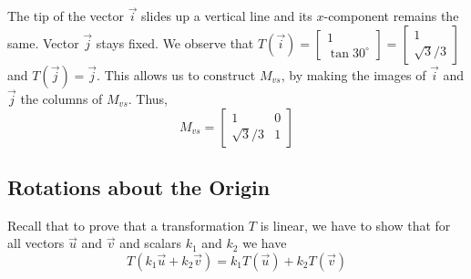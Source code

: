 \documentclass{ximera}
\begin{document}
\begin{example}
\begin{explanation}
\begin{center}
   \quad\quad
{}
\end{center}

The tip of the vector $\vec{i}$ slides up a vertical line and its $x$-component remains the same.  Vector $\vec{j}$ stays fixed.  We observe that $T(\vec{i})=\begin{bmatrix}
1 \\
\tan 30^{\circ}
\end{bmatrix}=\begin{bmatrix}
1 \\
\sqrt{3}/3
\end{bmatrix}$ and $T(\vec{j})=\vec{j}$.  This allows us to construct $M_{vs}$, by making the images of $\vec{i}$ and $\vec{j}$ the columns of $M_{vs}$.  Thus, 
$$M_{vs}=\begin{bmatrix}
1 & 0\\
\sqrt{3}/3 & 1
\end{bmatrix}$$
\end{explanation}
\end{example}



\subsection*{Rotations about the Origin}
Recall that to prove that a transformation $T$ is linear, we have to show that for all vectors $\vec{u}$ and $\vec{v}$ and scalars $k_1$ and $k_2$ we have
\begin{equation}\label{eq:rotlintrans}
T(k_1\vec{u}+k_2\vec{v})=k_1 T(\vec{u})+k_2 T(\vec{v})
\end{equation}
\end{document}
